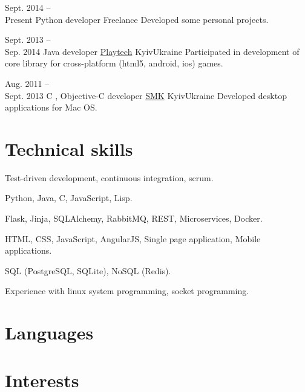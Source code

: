 \cventry
    {Sept. 2014 --\\Present}
    {Python developer}
    {Freelance}
    {}{}
    {Developed some personal projects.\newline}

\cventry
    {Sept. 2013 --\\Sep. 2014}
    {Java developer}
    {\href{http://playtech.com/}{Playtech}}
    {Kyiv}{Ukraine}
    {Participated in development of core library for
     cross-platform (html5, android, ios) games.\newline}

\cventry
    {Aug. 2011 --\\Sept. 2013}
    {C\nolinebreak\hspace{-.05em}\raisebox{.3ex}{\footnotesize +}
      \nolinebreak\hspace{-.3em}\raisebox{.3ex}{\footnotesize +}, Objective-C developer}
    {\href{http://mackiev.com/}{SMK}}
    {Kyiv}{Ukraine}
    {Developed desktop applications for Mac OS.}


\medskip


\section{Technical skills}



       {Test-driven development, continuous integration, scrum.}

       {Python, Java, C, JavaScript, Lisp.}

       {Flask, Jinja, SQLAlchemy, RabbitMQ, REST, Microservices, Docker.}

       {HTML, CSS, JavaScript, AngularJS,
        Single page application, Mobile applications.}

       {SQL (PostgreSQL, SQLite), NoSQL (Redis).}

       {Experience with linux system programming, socket programming.}
    
\medskip


%
%

\section{Languages}

\medskip

\section{Interests}



